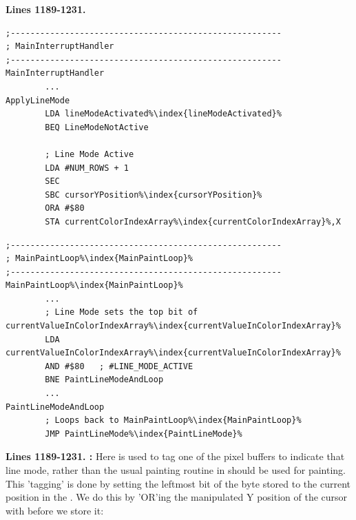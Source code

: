 \textbf{Lines 1189-1231. } 
\begin{lstlisting}[caption=From \icode{MainInterruptHandler}.,escapechar=\%]
;-------------------------------------------------------
; MainInterruptHandler
;-------------------------------------------------------
MainInterruptHandler
        ...
ApplyLineMode
        LDA lineModeActivated%\index{lineModeActivated}%
        BEQ LineModeNotActive

        ; Line Mode Active
        LDA #NUM_ROWS + 1
        SEC 
        SBC cursorYPosition%\index{cursorYPosition}%
        ORA #$80
        STA currentColorIndexArray%\index{currentColorIndexArray}%,X
\end{lstlisting}

\begin{lstlisting}[caption=From \icode{MainPaintLoop\index{MainPaintLoop}}.,escapechar=\%]
;-------------------------------------------------------
; MainPaintLoop%\index{MainPaintLoop}%
;-------------------------------------------------------
MainPaintLoop%\index{MainPaintLoop}%    
        ...
        ; Line Mode sets the top bit of currentValueInColorIndexArray%\index{currentValueInColorIndexArray}%
        LDA currentValueInColorIndexArray%\index{currentValueInColorIndexArray}%
        AND #$80   ; #LINE_MODE_ACTIVE
        BNE PaintLineModeAndLoop
        ...
PaintLineModeAndLoop
        ; Loops back to MainPaintLoop%\index{MainPaintLoop}%
        JMP PaintLineMode%\index{PaintLineMode}%
\end{lstlisting}
\clearpage
\textbf{Lines 1189-1231. :} Here  is used
to tag one of the pixel buffers to indicate that line mode, rather than the usual painting routine
in  should be used for painting. This 'tagging'
is done by setting the leftmost bit of the byte stored to the current position in the 
. We do this by 'OR'ing the manipulated Y position of the cursor
with  before we store it:

